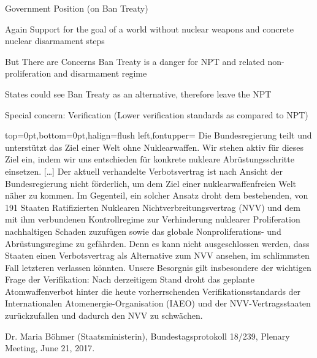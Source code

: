 \documentclass[presentation]{beamer}
\begin{document}
\begin{frame}[label={sec:org564b299}]{Government Position (on Ban Treaty)}
\begin{exampleblock}{Again}
Support for the goal of a world without nuclear weapons and concrete nuclear disarmament steps
\end{exampleblock}

\begin{alertblock}{But There are Concerns}
Ban Treaty is a danger for NPT and related non-proliferation and disarmament regime

States could see Ban Treaty as an alternative, therefore leave the NPT

Special concern: Verification (Lower verification standards as compared to NPT)
\end{alertblock}

\vspace{0.7cm}

\begin{tornpagetb}[fill=white]{top=0pt,bottom=0pt,halign=flush left,fontupper=\tiny}
Die Bundesregierung teilt und unterstützt das Ziel einer Welt ohne Nuklearwaffen.  Wir stehen aktiv für dieses Ziel ein, indem wir uns entschieden für konkrete nukleare Abrüstungsschritte einsetzen. 
[\ldots{}]
Der  aktuell  verhandelte  Verbotsvertrag  ist  nach  Ansicht  der  Bundesregierung  nicht  förderlich,  um  dem  Ziel  einer  nuklearwaffenfreien  Welt  näher  zu  kommen. Im  Gegenteil,  ein  solcher  Ansatz  droht  dem  bestehenden, von 191 Staaten Ratifizierten Nuklearen Nichtverbreitungsvertrag  (NVV)  und  dem  mit  ihm  verbundenen Kontrollregime  zur  Verhinderung  nuklearer  Proliferation  nachhaltigen  Schaden  zuzufügen  sowie  das  globale Nonproliferations- und Abrüstungsregime zu gefährden. Denn es kann nicht ausgeschlossen werden, dass Staaten einen Verbotsvertrag als Alternative zum NVV ansehen, im schlimmsten Fall letzteren verlassen könnten. Unsere  Besorgnis  gilt  insbesondere  der  wichtigen Frage  der  Verifikation:  Nach  derzeitigem  Stand  droht das  geplante  Atomwaffenverbot  hinter  die  heute  vorherrschenden Verifikationsstandards der Internationalen Atomenergie-Organisation  (IAEO)  und  der  NVV-Vertragsstaaten  zurückzufallen  und  dadurch  den  NVV  zu schwächen.
\end{tornpagetb}
\scriptsize 
\hfill Dr. Maria Böhmer (Staatsministerin), Bundestagsprotokoll 18/239, Plenary Meeting, June 21, 2017.
\end{frame}
\end{document}
